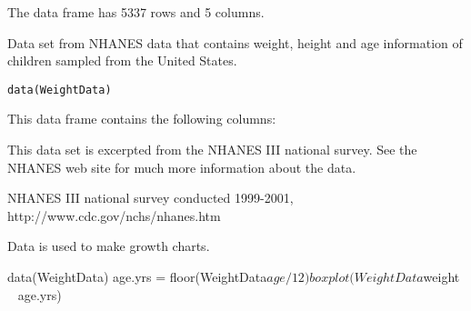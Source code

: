 \begin{Description}\relax
The  data frame has 5337 rows and 5 columns.

Data set from NHANES data that contains weight, height and age
information of children sampled from the United States.
\end{Description}
\begin{Usage}
\begin{verbatim}data(WeightData)\end{verbatim}
\end{Usage}
\begin{Format}\relax
This data frame contains the following columns:
\end{Format}
\begin{Details}\relax
This data set is excerpted from the NHANES III national survey.  See
the NHANES web site for much more information about the data.
\end{Details}
\begin{Source}\relax
NHANES III national survey conducted 1999-2001,
http://www.cdc.gov/nchs/nhanes.htm
\end{Source}
\begin{References}\relax
Data is used to make growth charts.
\end{References}
\begin{Examples}
\begin{ExampleCode}
data(WeightData)
age.yrs = floor(WeightData$age/12)
boxplot(WeightData$weight ~ age.yrs)
\end{ExampleCode}
\end{Examples}

